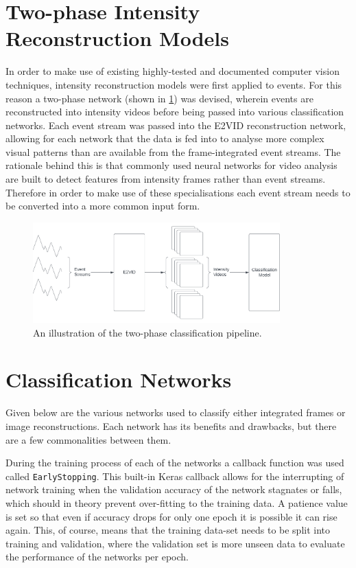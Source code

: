 \section{Two-phase Intensity Reconstruction Models}

In order to make use of existing highly-tested and documented computer vision techniques, intensity reconstruction models were first applied to events. For this reason a two-phase network (shown in \cref{fig:two_phase_network_pipeline}) was devised, wherein events are reconstructed into intensity videos before being passed into various classification networks. Each event stream was passed into the E2VID reconstruction network\cite{spikingToVideo}, allowing for each network that the data is fed into to analyse more complex visual patterns than are available from the frame-integrated event streams. The rationale behind this is that commonly used neural networks for video analysis are built to detect features from intensity frames rather than event streams. Therefore in order to make use of these specialisations each event stream needs to be converted into a more common input form.

\begin{figure}[htb]
    \centering
    \includegraphics[width=0.85\textwidth]{analysisanddesign/images/two_phase_network_pipeline.png}
    \caption{An illustration of the two-phase classification pipeline.}
    \label{fig:two_phase_network_pipeline}
\end{figure}

\section{Classification Networks}

Given below are the various networks used to classify either integrated frames or image reconstructions. Each network has its benefits and drawbacks, but there are a few commonalities between them. 

During the training process of each of the networks a callback function was used called \lstinline{EarlyStopping}. This built-in Keras callback allows for the interrupting of network training when the validation accuracy of the network stagnates or falls, which should in theory prevent over-fitting to the training data. A patience value is set so that even if accuracy drops for only one epoch it is possible it can rise again. This, of course, means that the training data-set needs to be split into training and validation, where the validation set is more unseen data to evaluate the performance of the networks per epoch.

